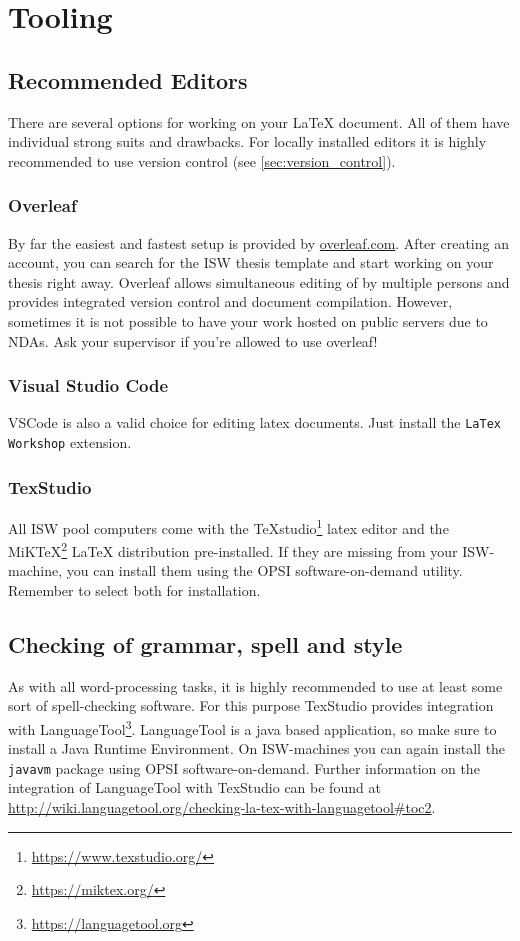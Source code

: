 \chapter{Tooling}

\section{Recommended Editors}
There are several options for working on your LaTeX document. All of them have individual strong suits and drawbacks. For locally installed editors it is highly recommended to use version control (see \autoref{sec:version_control}).

\subsection{Overleaf}
By far the easiest and fastest setup is provided by \url{overleaf.com}. After creating an account, you can search for the \ac{ISW} thesis template and start working on your thesis right away. Overleaf allows simultaneous editing of by multiple persons and provides integrated version control and document compilation.
However, sometimes it is not possible to have your work hosted on public servers due to \acp{NDA}. Ask your supervisor if you're allowed to use overleaf!

\subsection{Visual Studio Code}
VSCode is also a valid choice for editing latex documents. Just install the \texttt{LaTex Workshop} extension.

\subsection{TexStudio}
All \ac{ISW} pool computers come with the TeXstudio\footnote{\url{https://www.texstudio.org/}} latex editor and the MiKTeX\footnote{\url{https://miktex.org/}} LaTeX distribution pre-installed. If they are missing from your \ac{ISW}-machine, you can install them using the OPSI software-on-demand utility. Remember to select both for installation.


\section{Checking of grammar, spell and style}
As with all word-processing tasks, it is highly recommended to use at least some sort of spell-checking software.
For this purpose TexStudio provides integration with LanguageTool\footnote{\url{https://languagetool.org}}. LanguageTool is a java based application, so make sure to install a Java Runtime Environment. On \ac{ISW}-machines  you can again install the \texttt{javavm} package using OPSI software-on-demand. Further information on the integration of LanguageTool with TexStudio can be found at \url{http://wiki.languagetool.org/checking-la-tex-with-languagetool#toc2}.

